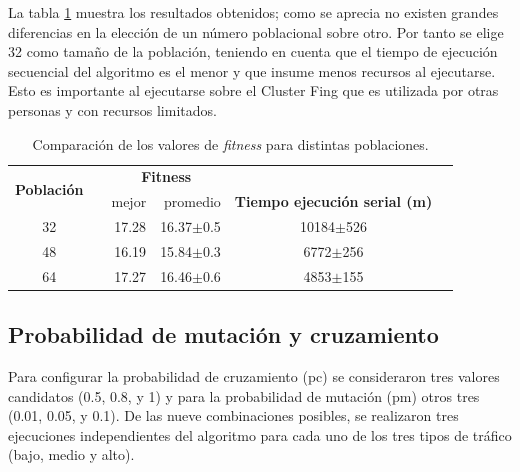 La tabla \ref{table:parametro_poblacion} muestra los resultados obtenidos; como se aprecia no existen grandes diferencias en la elección de un número poblacional sobre otro. Por tanto se elige 32 como tamaño de la población, teniendo en cuenta que el tiempo de ejecución secuencial del algoritmo es el menor y que insume menos recursos al ejecutarse. Esto es importante al ejecutarse sobre el Cluster Fing que es utilizada por otras personas y con recursos limitados.

\begin{table}[h]
	\renewcommand{\arraystretch}{1.2}
	\caption{Comparación de los valores de \emph{fitness} para distintas poblaciones.}
	\label{table:parametro_poblacion}
	\centering
	\begin{tabular}{ccrrcp{2cm}}
		\hline
	    \multirow{2}{*}{\textbf{Población}}& & 
		\multicolumn{2}{c}{\textbf{Fitness}} \\
		\cline{3-4}
		& & {mejor} 
		& {promedio} 
		& \textbf{Tiempo ejecución serial (m)} \\
		\hline
		32 & & {17.28} & 16.37$\pm$0.5 & 10184$\pm$526\\
		48 & & {16.19} & 15.84$\pm$0.3 & 6772$\pm$256\\
		64 & & {17.27} & 16.46$\pm$0.6 & 4853$\pm$155\\
		\hline
	\end{tabular}
\end{table}





\subsection{Probabilidad de mutación y cruzamiento}

Para configurar la probabilidad de cruzamiento (pc) se consideraron tres valores candidatos (0.5, 0.8, y 1) y para la probabilidad de mutación (pm) otros tres (0.01,  0.05,  y  0.1). De las nueve combinaciones posibles, se realizaron tres ejecuciones independientes del algoritmo para cada uno de los tres tipos de tráfico (bajo, medio y alto).  
 
